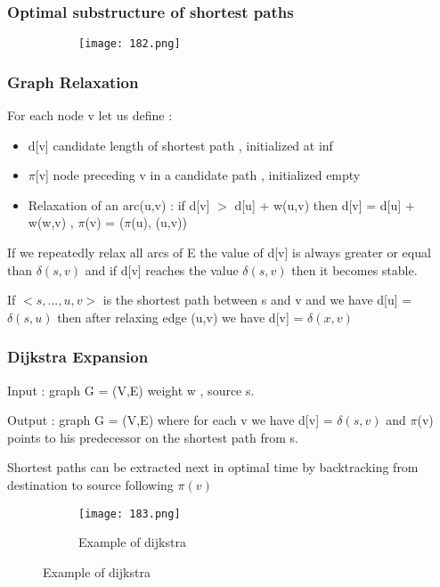 \documentclass{article}
\begin{document}
\subsubsection{Optimal substructure of shortest paths}

   \begin{figure}[ht!]
  \centering
  \begin{subfigure}[b]{0.9\linewidth}
    \texttt{[image: 182.png]}
  \end{subfigure}
\end{figure}

\subsubsection{Graph Relaxation}

For each node v let us define :

\begin{itemize}
    \item d[v] candidate length of shortest path , initialized at inf
    \item $\pi$[v] node preceding v in a candidate path , initialized empty
    \item Relaxation of an arc(u,v) : if d[v] $>$ d[u] + w(u,v) then d[v] = d[u] + w(w,v) , $\pi$(v) = ($\pi$(u), (u,v))
\end{itemize}

If we repeatedly relax all arcs of E the value of d[v] is always greater or equal than $\delta(s,v)$ and if d[v] reaches the value $\delta(s,v)$ then it becomes stable.

If $<s,...,u,v>$ is the shortest path between s and v and we have d[u] = $\delta(s,u)$ then after relaxing edge (u,v) we have d[v] = $\delta(x,v)$


\subsubsection{Dijkstra Expansion}

Input : graph G = (V,E) weight w , source s.

Output : graph G = (V,E) where for each v we have d[v] = $\delta(s,v)$ and $\pi$(v) points to his predecessor on the shortest path from s. 

Shortest paths can be extracted next in optimal time by backtracking from destination to source following $\pi(v)$

   \begin{figure}[ht!]
  \centering
  \begin{subfigure}[b]{0.7\linewidth}
    \texttt{[image: 183.png]}
    \caption{Example of dijkstra}
  \end{subfigure}
\end{figure}
\end{document}
